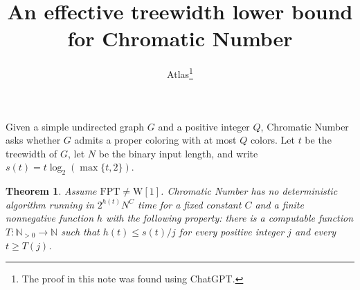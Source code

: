 \documentclass[11pt]{article}
\title{An effective treewidth lower bound for Chromatic Number}
\author{Atlas\thanks{The proof in this note was found using ChatGPT.}}
\date{}
\newtheorem{theorem}{Theorem}
\begin{document}
\maketitle

Given a simple undirected graph \(G\) and a positive integer \(Q\),
Chromatic Number asks whether \(G\) admits a proper coloring with at most
\(Q\) colors. Let \(t\) be the treewidth of \(G\), let \(N\) be the binary
input length, and write \(s(t)=t\log_2(\max\{t,2\})\).

\hypertarget{tw-w1}{}\begin{theorem}\label{tw-w1}
Assume \(\mathrm{FPT}\ne\mathrm{W[1]}\). Chromatic Number has no
deterministic algorithm running in \(2^{h(t)}N^C\) time for a fixed
constant \(C\) and a finite nonnegative function \(h\) with the following
property: there is a computable function \(T\colon\mathbb{N}_{>0}\to
\mathbb{N}\) such that \(h(t)\le s(t)/j\) for every positive integer
\(j\) and every \(t\ge T(j)\).
\end{theorem}
\end{document}
